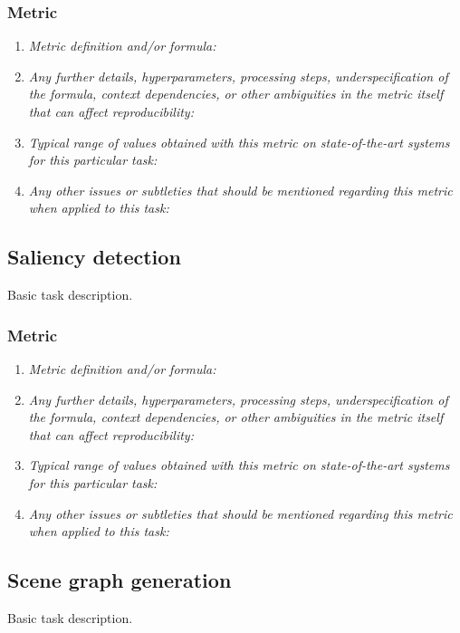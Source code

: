 \documentclass[a4paper,11pt]{article}
\begin{document}
    \subsubsection{Metric}
        \begin{enumerate}[label=\alph*.]
            \item \textit{Metric definition and/or formula:}
            \bigskip
            \item \textit{Any further details, hyperparameters, processing steps, underspecification of the formula, context dependencies, or other ambiguities in the metric itself that can affect reproducibility:}
            \bigskip
            \item \textit{Typical range of values obtained with this metric on state-of-the-art systems for this particular task:}
            \bigskip
            \item \textit{Any other issues or subtleties that should be mentioned regarding this metric when applied to this task:}
            \bigskip
        \end{enumerate}

\subsection{Saliency detection}
    Basic task description.
    \subsubsection{Metric}
        \begin{enumerate}[label=\alph*.]
            \item \textit{Metric definition and/or formula:}
            \bigskip
            \item \textit{Any further details, hyperparameters, processing steps, underspecification of the formula, context dependencies, or other ambiguities in the metric itself that can affect reproducibility:}
            \bigskip
            \item \textit{Typical range of values obtained with this metric on state-of-the-art systems for this particular task:}
            \bigskip
            \item \textit{Any other issues or subtleties that should be mentioned regarding this metric when applied to this task:}
            \bigskip
        \end{enumerate}

\subsection{Scene graph generation}
    Basic task description.
\end{document}
